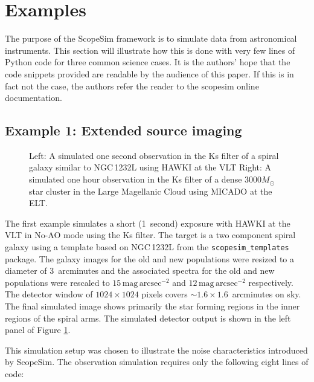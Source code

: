

\section{Examples}
\label{examples}

The purpose of the ScopeSim framework is to simulate data from astronomical instruments.
This section will illustrate how this is done with very few lines of Python code for three common science cases.
It is the authors' hope that the code snippets provided are readable by the audience of this paper.
If this is in fact not the case, the authors refer the reader to the scopesim online documentation.


\subsection{Example 1: Extended source imaging}
\label{example-1-extended-source-imaging}

\begin{figure}

\caption{Left: A simulated one second observation in the Ks filter of a spiral galaxy similar to NGC\,1232L using HAWKI at the VLT
Right: A simulated one hour observation in the Ks filter of a dense $3000 M_{\odot}$ star cluster in the Large Magellanic Cloud using MICADO at the ELT.}
\label{fig:combined_1_2}

\end{figure}

The first example simulates a short (1~second) exposure with HAWKI \cite{hawki} at the VLT in No-AO mode using the Ks filter.
The target is a two component spiral galaxy using a template based on NGC\,1232L from the \lstinline{scopesim_templates} package.
The galaxy images for the old and new populations were resized to a diameter of 3~arcminutes and the associated spectra for the old and new populations \citep{brown2014} were rescaled to $15\,\mathrm{mag\,arcsec^{-2}}$ and $12\,\mathrm{mag\,arcsec^{-2}}$ respectively.
The detector window of $1024 \times 1024$ pixels covers $\sim 1.6 \times 1.6$~arcminutes on sky.
The final simulated image shows primarily the star forming regions in the inner regions of the spiral arms.
The simulated detector output is shown in the left panel of Figure \ref{fig:combined_1_2}.

This simulation setup was chosen to illustrate the noise characteristics introduced by ScopeSim.
The observation simulation requires only the following eight lines of code:


